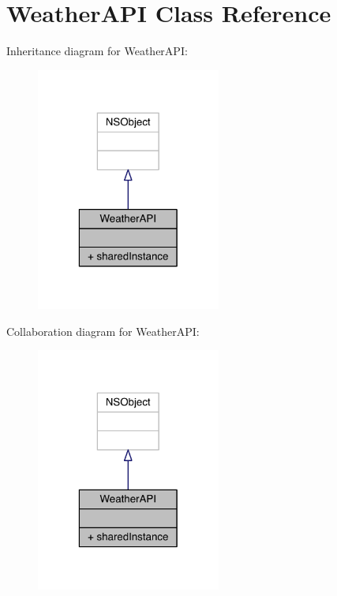 \hypertarget{interface_weather_a_p_i}{\section{Weather\-A\-P\-I Class Reference}
\label{interface_weather_a_p_i}
}


Inheritance diagram for Weather\-A\-P\-I\-:\nopagebreak
\begin{figure}[H]
\begin{center}
\leavevmode
\includegraphics[width=172pt]{interface_weather_a_p_i__inherit__graph}
\end{center}
\end{figure}


Collaboration diagram for Weather\-A\-P\-I\-:\nopagebreak
\begin{figure}[H]
\begin{center}
\leavevmode
\includegraphics[width=172pt]{interface_weather_a_p_i__coll__graph}
\end{center}
\end{figure}
